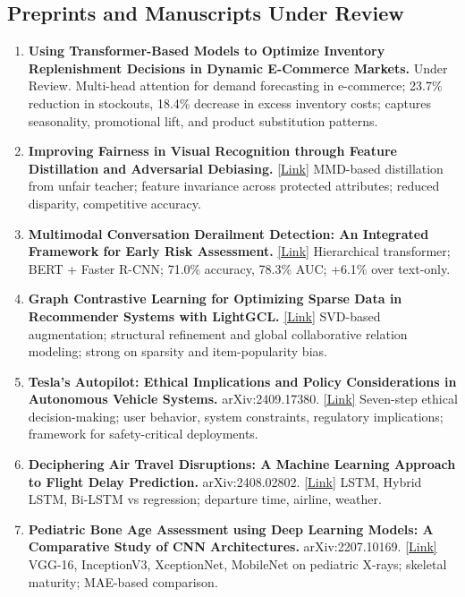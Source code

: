 \documentclass[11pt,a4paper]{article}
\begin{document}
\subsection*{Preprints and Manuscripts Under Review}
\begin{enumerate}[leftmargin=*,nosep]
  \item \textbf{Using Transformer-Based Models to Optimize Inventory Replenishment Decisions in Dynamic E-Commerce Markets.} Under Review. Multi-head attention for demand forecasting in e-commerce; 23.7\% reduction in stockouts, 18.4\% decrease in excess inventory costs; captures seasonality, promotional lift, and product substitution patterns.
  \item \textbf{Improving Fairness in Visual Recognition through Feature Distillation and Adversarial Debiasing.} \href{https://drive.google.com/file/d/1R5COOj2JY-Omxbo9tsHxiVuBQ6Jpqou2/view?usp=drive_link}{[Link]} MMD-based distillation from unfair teacher; feature invariance across protected attributes; reduced disparity, competitive accuracy.
  \item \textbf{Multimodal Conversation Derailment Detection: An Integrated Framework for Early Risk Assessment.} \href{https://drive.google.com/file/d/18lczqZVlpkBnT68dv-w-8IUNeHbGWiB4/view?usp=drive_link}{[Link]} Hierarchical transformer; BERT + Faster R-CNN; 71.0\% accuracy, 78.3\% AUC; +6.1\% over text-only.
  \item \textbf{Graph Contrastive Learning for Optimizing Sparse Data in Recommender Systems with LightGCL.} \href{https://drive.google.com/file/d/1ND3R-cwxMfOw16Wutt6KToq9feTAH5JE/view?usp=drive_link}{[Link]} SVD-based augmentation; structural refinement and global collaborative relation modeling; strong on sparsity and item-popularity bias.
  \item \textbf{Tesla's Autopilot: Ethical Implications and Policy Considerations in Autonomous Vehicle Systems.} arXiv:2409.17380. \href{https://arxiv.org/abs/2409.17380}{[Link]} Seven-step ethical decision-making; user behavior, system constraints, regulatory implications; framework for safety-critical deployments.
  \item \textbf{Deciphering Air Travel Disruptions: A Machine Learning Approach to Flight Delay Prediction.} arXiv:2408.02802. \href{https://arxiv.org/abs/2408.02802}{[Link]} LSTM, Hybrid LSTM, Bi-LSTM vs regression; departure time, airline, weather.
  \item \textbf{Pediatric Bone Age Assessment using Deep Learning Models: A Comparative Study of CNN Architectures.} arXiv:2207.10169. \href{https://arxiv.org/abs/2207.10169}{[Link]} VGG-16, InceptionV3, XceptionNet, MobileNet on pediatric X-rays; skeletal maturity; MAE-based comparison.
\end{enumerate}
\vspace{2pt}
\end{document}
